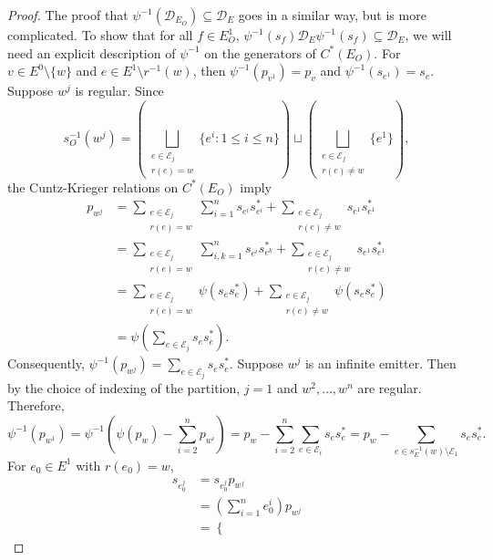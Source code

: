 \documentclass[12pt]{amsbook}%
\theoremstyle{defin}
\theoremstyle{remark}
\numberwithin{equation}{chapter}
\numberwithin{theor}{section}
\begin{document}
\begin{proof}
The proof that $\psi^{-1} ( \mathcal{D}_{E_O} ) \subseteq \mathcal{D}_E$ goes in a similar way, but is more complicated.  To show that for all $f \in E_O^1$, $\psi^{-1} (s_f) \mathcal{D}_E \psi^{-1} (s_f) \subseteq \mathcal{D}_E$, we will need an explicit description of $\psi^{-1}$ on the generators of $C^*(E_O)$.  For $v \in E^0 \setminus \{w\}$ and $e \in E^1 \setminus r^{-1}(w)$, then $\psi^{-1} ( p_{v^1} )= p_{v}$ and $\psi^{-1} ( s_{e^1} )= s_e$.  Suppose $w^j$ is regular.  Since 
\[
s_{O}^{-1} ( w^j ) = \left( \bigsqcup_{ \substack{ e \in \mathcal{E}_j \\ r(e) = w} } \{ e^i : 1 \leq i \leq n \}  \right) \sqcup \left( \bigsqcup_{ \substack{ e \in \mathcal{E}_j \\ r(e) \neq w} } \{ e^1 \} \right),
\]
the Cuntz-Krieger relations on $C^*(E_O)$ imply
\begin{align*}
p_{w^j} &= \sum_{ \substack{ e \in \mathcal{E}_j  \\ r(e)=w } } \sum_{ i = 1}^n s_{e^i} s_{e^{i}}^* + \sum_{ \substack{ e \in \mathcal{E}_j \\ r(e)\neq w } } s_{e^1} s_{e^{1}}^* \\
	&=  \sum_{ \substack{ e \in \mathcal{E}_j  \\ r(e)=w } } \sum_{ i ,k= 1}^n s_{e^i} s_{e^k}^*+ \sum_{ \substack{ e \in \mathcal{E}_j \\ r(e)\neq w } } s_{e^1} s_{e^{1}}^* \\
	&= \sum_{ \substack{ e \in \mathcal{E}_j  \\ r(e)=w } } \psi(s_e s_e^*) +  \sum_{ \substack{ e \in \mathcal{E}_j \\ r(e)\neq w } } \psi(s_e s_e^*) \\
	&= \psi\left(  \sum_{ e \in \mathcal{E}_j } s_e s_e^* \right).
\end{align*}
Consequently, $\psi^{-1} ( p_{w^j} ) =\sum_{e \in \mathcal{E}_j}  s_e s_e^*$.  Suppose $w^j$ is an infinite emitter.  Then by the choice of indexing of the partition, $j = 1$ and $w^2, \ldots, w^n$ are regular.  Therefore, 
\[
\psi^{-1} ( p_{w^1} ) = \psi^{-1} \left( \psi ( p_w ) - \sum_{i =2}^n p_{ w^i } \right) = p_w - \sum_{ i = 2}^n \sum_{e \in \mathcal{E}_i}  s_e s_e^* = p_w - \sum_{ e \in s_{E}^{-1}(w) \setminus \mathcal{E}_1} s_{e}s_e^*.
\]
For $e_0 \in E^1$ with $r( e_0) = w$, 
\begin{align*}
s_{e_0^j} &= s_{e_0^j} p_{w^j}  \\
&= \left( \sum_{ i =1}^n e_0^i \right) p_{w^j} \\
&=
\begin{cases}

\end{cases}
\end{align*}
\end{proof}
\end{document}
